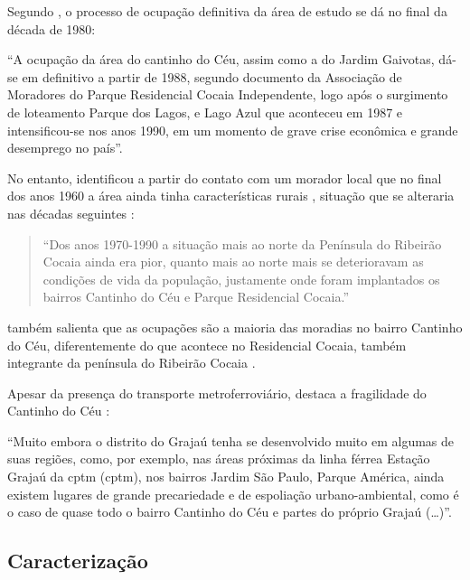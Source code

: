 	Segundo , o processo de ocupação definitiva da área de estudo se dá no final da década de 1980:
		
	\begin{citacao}
		``A ocupação da área do cantinho do Céu, assim como a do Jardim Gaivotas, dá-se em definitivo a partir de 1988, segundo documento da Associação de Moradores do Parque Residencial Cocaia Independente, logo após o surgimento de loteamento Parque dos Lagos, e Lago Azul que aconteceu em 1987 e intensificou-se nos anos 1990, em um momento de grave crise econômica e grande desemprego no país''.
	\end{citacao}

	No entanto,  identificou a partir do contato com um morador local que no final dos anos 1960 a área ainda tinha características rurais \cite[p.80]{Silva2016}, situação que se alteraria nas décadas seguintes \cite[p.82]{Silva2016}:
	
	\begin{quote}
		``Dos anos 1970-1990 a situação mais ao norte da Península do Ribeirão Cocaia ainda era pior, quanto mais ao norte mais se deterioravam as condições de vida da população, justamente onde foram implantados os bairros Cantinho do Céu e Parque Residencial Cocaia.''
	\end{quote}
	
	 também salienta que as ocupações são a maioria das moradias no bairro Cantinho do Céu, diferentemente do que acontece no Residencial Cocaia, também integrante da península do Ribeirão Cocaia \cite[p.83]{Silva2016}.
	
	Apesar da presença do transporte metroferroviário,  destaca a fragilidade do Cantinho do Céu \cite[p.98]{Silva2016}:
	
	\begin{citacao}
		``Muito embora o distrito do Grajaú tenha se desenvolvido muito em algumas de suas regiões, como, por exemplo, nas áreas próximas da linha férrea Estação Grajaú da \glsdesc{cptm} (\gls{cptm}), nos bairros Jardim São Paulo, Parque América, ainda existem lugares de grande	precariedade e de espoliação urbano-ambiental, como é o caso de quase todo o bairro Cantinho do Céu e partes do próprio Grajaú (\dots)''.
	\end{citacao}
	
	\subsection{Caracterização}
	
